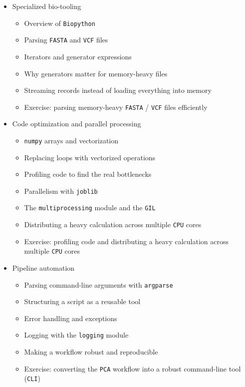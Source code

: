 \documentclass[
]{article}
\providecommand{\tightlist}{%
  \setlength{\itemsep}{0pt}\setlength{\parskip}{0pt}}
\begin{document}
\begin{itemize}
\tightlist
\item
  Specialized bio-tooling

  \begin{itemize}
  \tightlist
  \item
    Overview of \texttt{Biopython}
  \item
    Parsing \texttt{FASTA} and \texttt{VCF} files
  \item
    Iterators and generator expressions
  \item
    Why generators matter for memory-heavy files
  \item
    Streaming records instead of loading everything into memory
  \item
    Exercise: parsing memory-heavy \texttt{FASTA} / \texttt{VCF} files
    efficiently
  \end{itemize}
\end{itemize}

\begin{itemize}
\tightlist
\item
  Code optimization and parallel processing

  \begin{itemize}
  \tightlist
  \item
    \texttt{numpy} arrays and vectorization
  \item
    Replacing loops with vectorized operations
  \item
    Profiling code to find the real bottlenecks
  \item
    Parallelism with \texttt{joblib}
  \item
    The \texttt{multiprocessing} module and the \texttt{GIL}
  \item
    Distributing a heavy calculation across multiple \texttt{CPU} cores
  \item
    Exercise: profiling code and distributing a heavy calculation across
    multiple \texttt{CPU} cores
  \end{itemize}
\end{itemize}

\begin{itemize}
\tightlist
\item
  Pipeline automation

  \begin{itemize}
  \tightlist
  \item
    Parsing command-line arguments with \texttt{argparse}
  \item
    Structuring a script as a reusable tool
  \item
    Error handling and exceptions
  \item
    Logging with the \texttt{logging} module
  \item
    Making a workflow robust and reproducible
  \item
    Exercise: converting the \texttt{PCA} workflow into a robust
    command-line tool (\texttt{CLI})
  \end{itemize}
\end{itemize}
\end{document}
